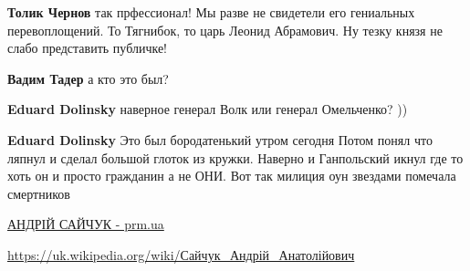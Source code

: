 \begin{itemize}
\begin{itemize}
\textbf{Толик Чернов} так прфессионал! Мы разве не свидетели его гениальных перевоплощений. То Тягнибок, то царь Леонид Абрамович. Ну тезку князя не слабо представить публичке!


 
\textbf{Вадим Тадер} а кто это был?

 
\textbf{Eduard Dolinsky} наверное генерал Волк или генерал Омельченко? ))

 
\textbf{Eduard Dolinsky} Это был бородатенький утром сегодня Потом понял что
ляпнул и сделал большой глоток из кружки. Наверно и Ганпольский икнул где то
хоть он и просто гражданин а не ОНИ. Вот так милиция оун звездами помечала
смертников

 
\href{https://prm.ua/leadings/andriy-saychuk/}{%
АНДРІЙ САЙЧУК - prm.ua%
}

 
\url{https://uk.wikipedia.org/wiki/Сайчук_Андрій_Анатолійович}

\end{itemize}

\end{itemize}

